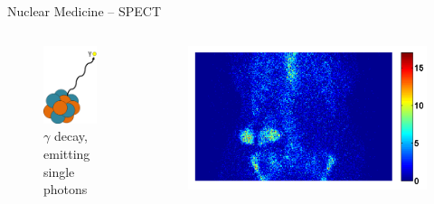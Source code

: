 \begin{frame}[c]{Nuclear Medicine -- SPECT}
	\begin{columns}[c, onlytextwidth]
		\begin{column}{0.45\textwidth}
			\begin{center}
				\begin{figure}
					\includegraphics[width=.4\linewidth]{images/gammaemission.png}
					\caption{\normalsize $\gamma$ decay, emitting single photons}
				\end{figure}
			\end{center}
		\end{column}\begin{column}{0.5\textwidth}
			\begin{figure}
				\centering{}
				\includegraphics[width=1.0\linewidth]{images/boneproj.png}

\end{figure}
\end{column}
\end{columns}
\end{frame}
